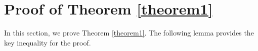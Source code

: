 \documentclass[nohyperref]{article}
\theoremstyle{plain}
\theoremstyle{definition}
\theoremstyle{remark}
\begin{document}



\newpage
\appendix
\onecolumn

\section{Proof of Theorem \ref{theorem1}} \label{appA}
\renewcommand{\theequation}{A.\arabic{equation}}
In this section, %
we prove Theorem \ref{theorem1}.
The following lemma provides the key inequality for the proof.
\end{document}
